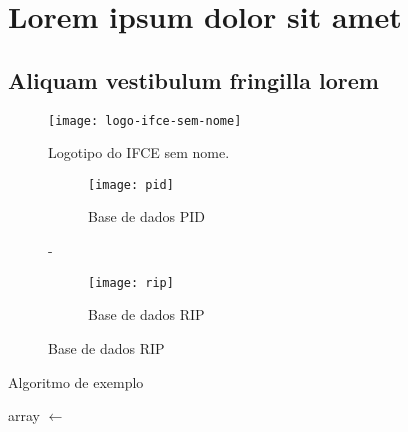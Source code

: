 \chapter{Lorem ipsum dolor sit amet}\label{cap:exampleChapter}
\section{Aliquam vestibulum fringilla lorem}

\lipsum[1]

\begin{figure}[H]
	\begin{center}
		\label{fig:1}
		\caption{Logotipo do IFCE sem nome.}
		\texttt{[image: logo-ifce-sem-nome]}
		\newline
	\end{center}
\end{figure}

\lipsum[2-3]


\lipsum[2-3]
\begin{figure}
	\centering
	\caption{Exemplo de gráfico}\label{fig:animals}
	\begin{subfigure}[b]{0.45\textwidth}
		\texttt{[image: pid]}
		\caption{Base de dados PID}
		\label{fig:pid}
	\end{subfigure}
	-
	\begin{subfigure}[b]{0.45\textwidth}
		\texttt{[image: rip]}
		\caption{Base de dados RIP}
		\label{fig:rip}
	\end{subfigure}
	\newline
\end{figure}


\lipsum[2]

\begin{algorithm}
	\caption{Algoritmo de exemplo}\label{bogosort}
	\begin{algorithmic}[1]
		\State array $\gets$  
		\EndWhile
		\EndProcedure
	\end{algorithmic}
\end{algorithm}

\lipsum[1]
